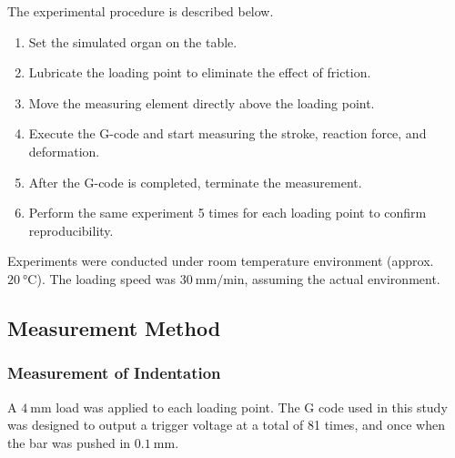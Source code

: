 The experimental procedure is described below.
\begin{enumerate}
    \item Set the simulated organ on the table.
    \item Lubricate the loading point to eliminate the effect of friction.
    \item Move the measuring element directly above the loading point.
    \item Execute the G-code and start measuring the stroke, reaction force, and deformation.
    \item After the G-code is completed, terminate the measurement.
    \item Perform the same experiment 5 times for each loading point to confirm reproducibility.
\end{enumerate}

Experiments were conducted under room temperature environment (approx. $\SI{20}{\degreeCelsius}$).
The loading speed was $\SI[per-mode = symbol]{30}{\milli \m\per \minute}$, assuming the actual environment. 

\subsection*{Measurement Method}
\subsubsection*{Measurement of Indentation}
A $\SI{4}{\milli \m}$ load was applied to each loading point. The G code used in this study was designed to output a trigger voltage at a total of \SI{81}{}
times, and once when the bar was pushed in $\SI{0.1}{\milli \m}$.

